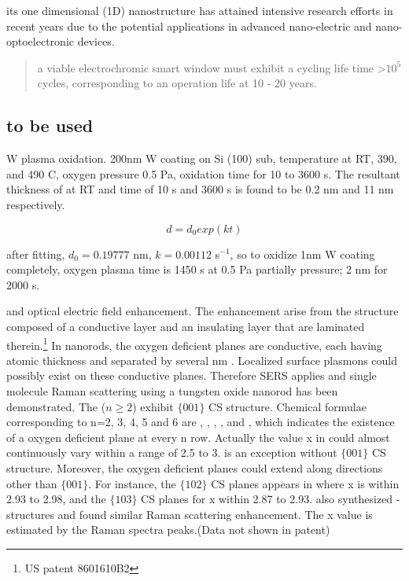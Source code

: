 its one dimensional (1D) nanostructure has attained intensive research efforts in recent years due to the potential applications in advanced nano-electric and nano-optoelectronic devices.

\begin{quote}
a viable electrochromic smart window must exhibit a cycling life time \textgreater $10^5$ cycles, corresponding to an operation life at 10 - 20 years.
\end{quote}

\subsection{to be used}

W plasma oxidation.\cite{Romanyuk2005} 200nm W coating on Si (100) sub, temperature at RT, 390, and 490 C, oxygen pressure 0.5 Pa, oxidation time for 10 to 3600 s. The resultant thickness of  at RT  and time of 10 s and 3600 s is found to be 0.2 nm and 11 nm respectively.

\[
 d = d_0 exp(kt)
\]

after fitting, $d_0 = 0.19777$ nm, $k = 0.00112 $ s$^{-1}$, so to oxidize 1nm W coating completely, oxygen plasma time is 1450 s at 0.5 Pa partially pressure; 2 nm for 2000 s.



 and optical electric field enhancement. The enhancement arise from the structure composed of a conductive layer and an insulating layer that are laminated therein.\footnote{US patent 8601610B2} In  nanorods, the oxygen deficient planes are conductive, each having atomic thickness and separated by several nm . Localized surface plasmons could possibly exist on these conductive planes. Therefore SERS applies and single molecule Raman scattering using a tungsten oxide nanorod has been demonstrated. The  ($n \geq 2$) exhibit $\{ 001 \}$ CS structure. Chemical formulae corresponding to n=2, 3, 4, 5 and 6 are , , , , and , which indicates the existence of a oxygen deficient plane at every n row. Actually the value x in  could almost continuously vary within a range of 2.5 to 3.  is an exception without $\{ 001 \}$ CS structure. Moreover, the oxygen deficient planes could extend along directions other than $\{ 001 \}$. For instance, the $\{ 102 \}$ CS planes appears in  where x is within 2.93 to 2.98, and  the $\{ 103 \}$ CS planes for x within 2.87 to 2.93.\cite{Sloan1999}  \citeauthor{Shingaya2013} also synthesized - structures and found similar Raman scattering enhancement. The x value is estimated by the Raman spectra peaks.\cite{Shingaya2013}(Data not shown in patent)

